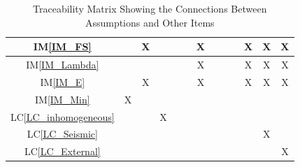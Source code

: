\documentclass[12pt]{article}
\newcommand{\iref}[1]{IM\ref{#1}}
\newcommand{\lcref}[1]{LC\ref{#1}}
\begin{document}
\begin{table}[h!]
\begin{tabular}{|c|c|c|c|c|c|c|c|c|c|c|c|c|}
\iref{IM_FS}            & & X& & & & X& & & & X& X& X\\ \hline
\iref{IM_Lambda}        & & & & & & X& & & & X& X& X\\ \hline
\iref{IM_E}             & & X& & & & X& & & & X& X& X\\ \hline
\iref{IM_Min}           & X& & & & & & & & & & & \\ \hline
\lcref{LC_inhomogeneous}& & & X& & & & & & & & & \\ \hline
\lcref{LC_Seismic}      & & & & & & & & & & & X& \\ \hline
\lcref{LC_External}     & & & & & & & & & & & & X\\
\hline
\end{tabular}
\caption{Traceability Matrix Showing the Connections Between Assumptions 
and Other Items}
\label{Table:A_trace}
\end{table}
\end{document}
